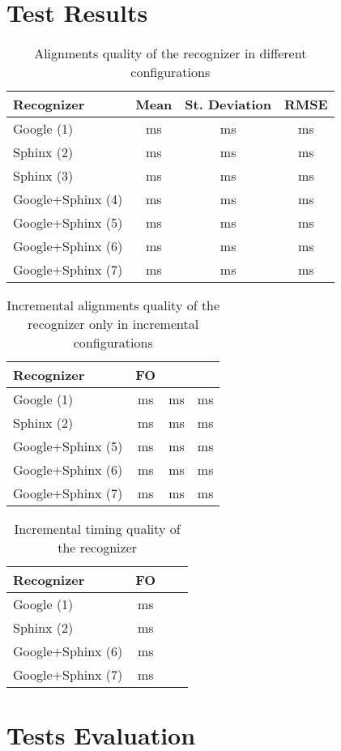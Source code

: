 \section {Test Results} 
\begin {table}
\label{tab:alignment_non_increm} 
\begin{center}
    \begin{tabular}{| l | c | c | c |}
    \hline
    Recognizer & Mean & St. Deviation & RMSE \\ \hline
    Google (1)  & ms & ms & ms \\ \hline
    Sphinx (2)  & ms & ms & ms \\ \hline
    Sphinx (3)  & ms & ms & ms \\ \hline
    Google+Sphinx (4)  & ms & ms & ms \\ \hline
    Google+Sphinx (5)  & ms & ms & ms \\ \hline
    Google+Sphinx (6)  & ms & ms & ms \\ \hline
     Google+Sphinx (7)  & ms & ms & ms \\ \hline   
    \end{tabular}
\caption {Alignments quality of the recognizer in different configurations}
\end{center}
\end {table}

\begin {table}
\label{tab:alignment_incr} 
\begin{center}
    \begin{tabular}{| l | c | c | c |}
    \hline
    Recognizer & FO \\ \hline
    Google (1)  & ms & ms & ms \\ \hline
    Sphinx (2)  & ms & ms & ms \\ \hline
    Google+Sphinx (5)  & ms & ms & ms \\ \hline
    Google+Sphinx (6)  & ms & ms & ms \\ \hline
    Google+Sphinx (7)  & ms & ms & ms \\ \hline   
    \end{tabular}
\caption {Incremental alignments quality of the recognizer only in incremental
configurations}
\end{center}
\end {table}

\begin {table}
\label{tab:alignment_incr} 
\begin{center}
    \begin{tabular}{| l | c | c | c |}
    \hline
    Recognizer & FO \\ \hline
    Google (1)  & ms  \\ \hline
    Sphinx (2)  & ms  \\ \hline
    Google+Sphinx (6)  & ms  \\ \hline
    Google+Sphinx (7)  & ms  \\ \hline   
    \end{tabular}
\caption {Incremental timing quality of the recognizer}
\end{center}
\end {table}



\section {Tests Evaluation} 